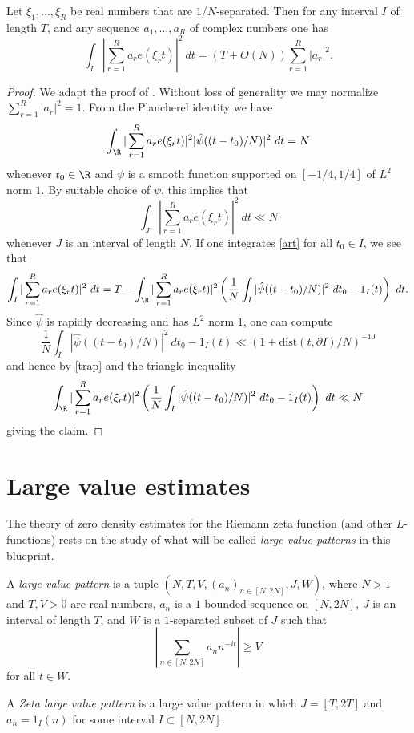 \begin{lemma}\label{l2-int}
\leanok
Let $\xi_1,\dots,\xi_R$ be real numbers that are $1/N$-separated.  Then for any interval $I$ of length $T$, and any sequence $a_1,\dots,a_R$ of complex numbers one has
$$ \int_I |\sum_{r=1}^R a_r e(\xi_r t)|^2\ dt = (T + O(N)) \sum_{r=1}^R |a_r|^2.$$
\end{lemma}

\begin{proof}\leanok We adapt the proof of \cite[Theorem 9.1]{ik}.  Without loss of generality we may normalize
    $\sum_{r=1}^R |a_r|^2=1$.    From the Plancherel identity we have
\begin{equation}\label{art}
 \int_\R |\sum_{r=1}^R a_r e(\xi_r t)|^2 |\hat \psi((t-t_0)/N)|^2\ dt = N
 \end{equation}
whenever $t_0 \in \R$ and $\psi$ is a smooth function supported on $[-1/4, 1/4]$ of $L^2$ norm $1$.   By suitable choice of $\psi$, this implies that
\begin{equation}\label{trap}
 \int_J |\sum_{r=1}^R a_r e(\xi_r t)|^2\ dt \ll N
\end{equation}
whenever $J$ is an interval of length $N$.  If one integrates \eqref{art} for all $t_0 \in I$, we see that
$$ \int_I |\sum_{r=1}^R a_r e(\xi_r t)|^2\ dt = T - \int_\R |\sum_{r=1}^R a_r e(\xi_r t)|^2 \left(\frac{1}{N} \int_I |\hat \psi((t-t_0)/N)|^2\ dt_0 - 1_I(t)\right)\ dt.$$
Since $\hat \psi$ is rapidly decreasing and has $L^2$ norm $1$, one can compute
$$ \frac{1}{N} \int_I |\hat \psi((t-t_0)/N)|^2\ dt_0 - 1_I(t) \ll (1 + \mathrm{dist}(t, \partial I) / N)^{-10}$$
and hence by \eqref{trap} and the triangle inequality
$$ \int_\R |\sum_{r=1}^R a_r e(\xi_r t)|^2 \left(\frac{1}{N} \int_I |\hat \psi((t-t_0)/N)|^2\ dt_0 - 1_I(t)\right)\ dt \ll N$$
giving the claim.
\end{proof}


\chapter{Large value estimates}\label{largevalue-chapter}

The theory of zero density estimates for the Riemann zeta function (and other $L$-functions) rests on the study of what will be called \emph{large value patterns} in this blueprint.

\begin{definition}\label{large-pattern-def} A \emph{large value pattern} is a tuple $(N, T, V, (a_n)_{n \in [N,2N]}, J, W)$, where $N > 1$ and $T, V > 0$ are real numbers, $a_n$ is a $1$-bounded sequence on $[N,2N]$, $J$ is an interval of length $T$, and $W$ is a $1$-separated subset of $J$ such that
\begin{equation}\label{V-large}
        \left|\sum_{n \in [N,2N]} a_n n^{-it} \right| \geq V
\end{equation}
for all $t \in W$.

A \emph{Zeta large value pattern} is a large value pattern in which $J = [T,2T]$ and $a_n = 1_I(n)$ for some interval $I \subset [N,2N]$.
\end{definition}

